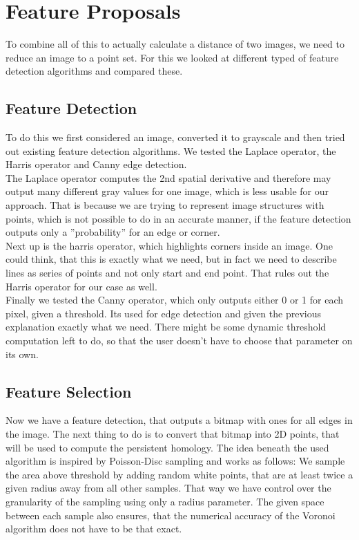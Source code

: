 \documentclass[11pt, a4paper, UKenglish]{article}
\begin{document}
    \section{Feature Proposals}\label{sec:feature-proposals2}
    To combine all of this to actually calculate a distance of two images, we need to reduce an image to a point set.
    For this we looked at different typed of feature detection algorithms and compared these.
    \subsection{Feature Detection}\label{subsec:feature-detection}
    To do this we first considered an image, converted it to grayscale and then tried out existing feature detection algorithms.
    We tested the Laplace operator, the Harris operator and Canny edge detection.\\
    The Laplace operator computes the 2nd spatial derivative and therefore may output many different gray values for one image, which is less usable for our approach.
    That is because we are trying to represent image structures with points, which is not possible to do in an accurate manner, if the feature detection outputs only a ''probability'' for an edge or corner.\\
    Next up is the harris operator, which highlights corners inside an image.
    One could think, that this is exactly what we need, but in fact we need to describe lines as series of points and not only start and end point.
    That rules out the Harris operator for our case as well.\\
    Finally we tested the Canny operator, which only outputs either 0 or 1 for each pixel, given a threshold.
    Its used for edge detection and given the previous explanation exactly what we need.
    There might be some dynamic threshold computation left to do, so that the user doesn't have to choose that parameter on its own.
    \subsection{Feature Selection}\label{subsec:feature-selection}
    Now we have a feature detection, that outputs a bitmap with ones for all edges in the image.
    The next thing to do is to convert that bitmap into 2D points, that will be used to compute the persistent homology.
    The idea beneath the used algorithm is inspired by Poisson-Disc sampling and works as follows:
    We sample the area above threshold by adding random white points, that are at least twice a given radius away from all other samples.
    That way we have control over the granularity of the sampling using only a radius parameter.
    The given space between each sample also ensures, that the numerical accuracy of the Voronoi algorithm does not have to be that exact.
    
\end{document}
